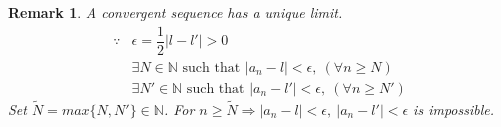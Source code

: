 \documentclass[a4paper,10pt]{article}
\newtheorem{remark}{Remark}
\newcommand{\N}{\mathbb{N}}
\begin{document}
\begin{remark}
	A convergent sequence has a unique limit.\\
	\begin{eqnarray} \nonumber
	\because & \epsilon = \dfrac{1}{2}|l-l\prime|>0 \\ \nonumber
	& \exists N\in\N \text{ such that } |a_{n}-l| < \epsilon, \ (\forall n \geq N) \\ \nonumber
	& \exists N\prime\in\N \text{ such that } |a_{n}-l\prime| < \epsilon, \ (\forall n \geq N\prime)
	\end{eqnarray}
	Set $ \tilde{N} = max \{ N,N\prime \} \in \N $. For $ n\geq \tilde{N} \Rightarrow |a_{n}-l|<\epsilon, \ |a_{n}-l\prime|<\epsilon $ is impossible.
\end{remark}
\end{document}
